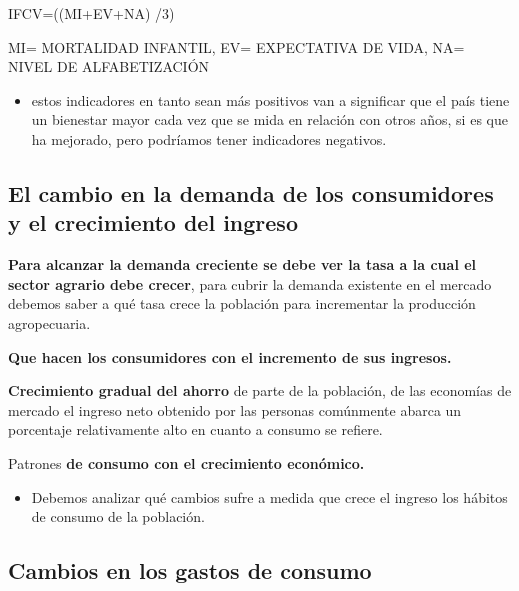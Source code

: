 \documentclass[
  a4paper,
]{article}
\providecommand{\tightlist}{%
  \setlength{\itemsep}{0pt}\setlength{\parskip}{0pt}}\usepackage{longtable,booktabs,array}
\begin{document}
IFCV=((MI+EV+NA) /3)

MI= MORTALIDAD INFANTIL, EV= EXPECTATIVA DE VIDA, NA= NIVEL DE
ALFABETIZACIÓN

\begin{itemize}
\tightlist
\item
  estos indicadores en tanto sean más positivos van a significar que el
  país tiene un bienestar mayor cada vez que se mida en relación con
  otros años, si es que ha mejorado, pero podríamos tener indicadores
  negativos.
\end{itemize}

\hypertarget{el-cambio-en-la-demanda-de-los-consumidores-y-el-crecimiento-del-ingreso}{%
\subsection{El cambio en la demanda de los consumidores y el crecimiento
del
ingreso}\label{el-cambio-en-la-demanda-de-los-consumidores-y-el-crecimiento-del-ingreso}}

\textbf{Para alcanzar la demanda creciente se debe ver la tasa a la cual
el sector agrario debe crecer}, para cubrir la demanda existente en el
mercado debemos saber a qué tasa crece la población para incrementar la
producción agropecuaria.

\textbf{Que hacen los consumidores con el incremento de sus ingresos.}

\textbf{Crecimiento gradual del ahorro} de parte de la población, de las
economías de mercado el ingreso neto obtenido por las personas
comúnmente abarca un porcentaje relativamente alto en cuanto a consumo
se refiere.

Patrones \textbf{de consumo con el crecimiento económico.}

\begin{itemize}
\tightlist
\item
  Debemos analizar qué cambios sufre a medida que crece el ingreso los
  hábitos de consumo de la población.
\end{itemize}

\hypertarget{cambios-en-los-gastos-de-consumo}{%
\subsection{Cambios en los gastos de
consumo}\label{cambios-en-los-gastos-de-consumo}}
\end{document}
